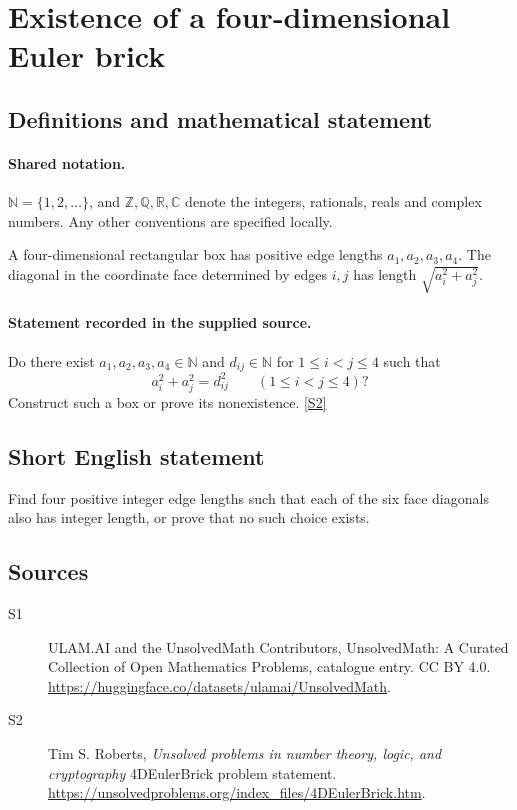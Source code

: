 \documentclass[11pt]{article}
\newcommand{\sref}[2]{\hyperlink{source:#1:#2}{[S#2]}}
\begin{document}
\section{Existence of a four-dimensional Euler brick}\label{statement}

\subsection{Definitions and mathematical statement}

\paragraph{Shared notation.}$\mathbb N=\{1,2,\ldots\}$, and $\mathbb Z,\mathbb Q,\mathbb R,\mathbb C$ denote the integers, rationals, reals and complex numbers. Any other conventions are specified locally.


A four-dimensional rectangular box has positive edge lengths $a_1,a_2,a_3,a_4$. The diagonal in the coordinate face determined by edges $i,j$ has length $\sqrt{a_i^2+a_j^2}$.
\paragraph{Statement recorded in the supplied source.}
Do there exist $a_1,a_2,a_3,a_4\in\mathbb N$ and $d_{ij}\in\mathbb N$ for $1\le i<j\le4$ such that
\[
a_i^2+a_j^2=d_{ij}^2\qquad(1\le i<j\le4)?
\]
Construct such a box or prove its nonexistence. \sref{statement}{2}
\subsection{Short English statement}
Find four positive integer edge lengths such that each of the six face diagonals also has integer length, or prove that no such choice exists.
\subsection{Sources}
\begin{description}
\item[\hypertarget{source:statement:1}{S1}] ULAM.AI and the UnsolvedMath Contributors, UnsolvedMath: A Curated Collection of Open Mathematics Problems, catalogue entry. CC BY 4.0. \url{https://huggingface.co/datasets/ulamai/UnsolvedMath}.
\item[\hypertarget{source:statement:2}{S2}] Tim S. Roberts, \emph{Unsolved problems in number theory, logic, and cryptography} 4DEulerBrick problem statement. \url{https://unsolvedproblems.org/index_files/4DEulerBrick.htm}.
\end{description}
\label{end:statement}
\end{document}
